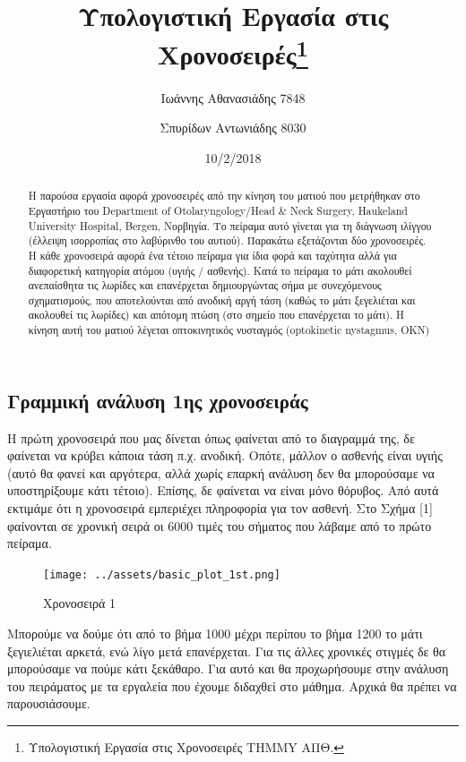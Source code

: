 \documentclass[11pt,]{article}
\title{Υπολογιστική Εργασία στις Χρονοσειρές\thanks{Υπολογιστική Εργασία στις Χρονοσειρές THMMY ΑΠΘ.}}
\author{Ιωάννης Αθανασιάδης 7848 \and Σπυρίδων Αντωνιάδης 8030}
\date{10/2/2018}
\begin{document}
\maketitle
\begin{abstract}
Η παρούσα εργασία αφορά χρονοσειρές από την κίνηση του ματιού που
μετρήθηκαν στο Εργαστήριο του Department of Otolaryngology/Head \& Neck
Surgery, Haukeland University Hospital, Bergen, Νορβηγία. Το πείραμα
αυτό γίνεται για τη διάγνωση ιλίγγου (έλλειψη ισορροπίας στο λαβύρινθο
του αυτιού). Παρακάτω εξετάζονται δύο χρονοσειρές. Η κάθε χρονοσειρά
αφορά ένα τέτοιο πείραμα για ίδια φορά και ταχύτητα αλλά για διαφορετική
κατηγορία ατόμου (υγιής / ασθενής). Κατά το πείραμα το μάτι ακολουθεί
ανεπαίσθητα τις λωρίδες και επανέρχεται δημιουργώντας σήμα με
συνεχόμενους σχηματισμούς, που αποτελούνται από ανοδική αργή τάση (καθώς
το μάτι ξεγελιέται και ακολουθεί τις λωρίδες) και απότομη πτώση (στο
σημείο που επανέρχεται το μάτι). Η κίνηση αυτή του ματιού λέγεται
οπτοκινητικός νυσταγμός (optokinetic nystagmus, OKN)
\end{abstract}

\hypertarget{ux3b3ux3c1ux3b1ux3bcux3bcux3b9ux3baux3ae-ux3b1ux3bdux3acux3bbux3c5ux3c3ux3b7-1ux3b7ux3c2-ux3c7ux3c1ux3bfux3bdux3bfux3c3ux3b5ux3b9ux3c1ux3acux3c2}{%
\subsection{Γραμμική ανάλυση 1ης
χρονοσειράς}\label{ux3b3ux3c1ux3b1ux3bcux3bcux3b9ux3baux3ae-ux3b1ux3bdux3acux3bbux3c5ux3c3ux3b7-1ux3b7ux3c2-ux3c7ux3c1ux3bfux3bdux3bfux3c3ux3b5ux3b9ux3c1ux3acux3c2}}

Η πρώτη χρονοσειρά που μας δίνεται όπως φαίνεται από το διαγραμμά της,
δε φαίνεται να κρύβει κάποια τάση π.χ. ανοδική. Οπότε, μάλλον ο ασθενής
είναι υγιής (αυτό θα φανεί και αργότερα, αλλά χωρίς επαρκή ανάλυση δεν
θα μπορούσαμε να υποστηρίξουμε κάτι τέτοιο). Επίσης, δε φαίνεται να
είναι μόνο θόρυβος. Από αυτά εκτιμάμε ότι η χρονοσειρά εμπεριέχει
πληροφορία για τον ασθενή. Στο Σχήμα {[}1{]} φαίνονται σε χρονική σειρά
οι 6000 τιμές του σήματος που λάβαμε από το πρώτο πείραμα.

\begin{figure}
\centering
\texttt{[image: ../assets/basic\_plot\_1st.png]}
\caption{Χρονοσειρά 1}
\end{figure}

Μπορούμε να δούμε ότι από το βήμα 1000 μέχρι περίπου το βήμα 1200 το
μάτι ξεγιελιέται αρκετά, ενώ λίγο μετά επανέρχεται. Για τις άλλες
χρονικές στιγμές δε θα μπορούσαμε να πούμε κάτι ξεκάθαρο. Για αυτό και
θα προχωρήσουμε στην ανάλυση του πειράματος με τα εργαλεία που έχουμε
διδαχθεί στο μάθημα. Αρχικά θα πρέπει να παρουσιάσουμε.
\end{document}
